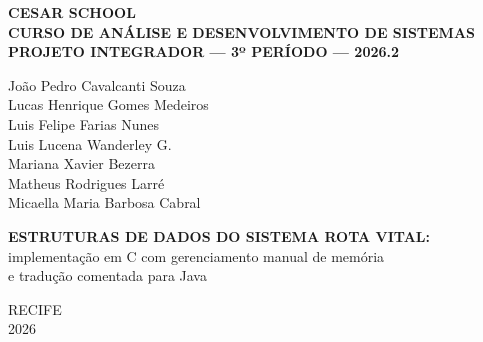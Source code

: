 \documentclass[12pt,a4paper,oneside]{report}
\renewcommand{\headrulewidth}{0pt}
\begin{document}
\pagestyle{empty}
\fancypagestyle{plain}{\fancyhf{}\renewcommand{\headrulewidth}{0pt}}

\begin{center}\thispagestyle{empty}
\begin{center}
\onehalfspacing
\textbf{CESAR SCHOOL}\\
\textbf{CURSO DE ANÁLISE E DESENVOLVIMENTO DE SISTEMAS}\\
\textbf{PROJETO INTEGRADOR — 3º PERÍODO — 2026.2}

\vspace{2.2cm}

João Pedro Cavalcanti Souza\\
Lucas Henrique Gomes Medeiros\\
Luis Felipe Farias Nunes\\
Luis Lucena Wanderley G.\\
Mariana Xavier Bezerra\\
Matheus Rodrigues Larré\\
Micaella Maria Barbosa Cabral

\vfill

\textbf{ESTRUTURAS DE DADOS DO SISTEMA ROTA VITAL:}\\
implementação em C com gerenciamento manual de memória\\
e tradução comentada para Java

\vfill

RECIFE\\
2026
\end{center}
\end{center}\newpage
\end{document}
